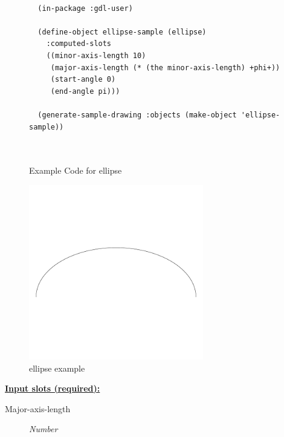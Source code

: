 \documentclass [11pt]{book}
\begin{document}
\begin{itemize}
\begin{figure}
\begin{lrbox}{\boxedverb}
\begin{minipage}{\linewidth}
{\begin{verbatim}
  
  (in-package :gdl-user)

  (define-object ellipse-sample (ellipse)
    :computed-slots
    ((minor-axis-length 10)
     (major-axis-length (* (the minor-axis-length) +phi+))
     (start-angle 0)
     (end-angle pi)))

  (generate-sample-drawing :objects (make-object 'ellipse-sample))
  
  
\end{verbatim}}
\end{minipage}
\end{lrbox}
\fbox{\usebox{\boxedverb}}

\caption{Example Code for ellipse}

\label{fig:example-code-ellipse}

\end{figure}

\begin{figure}
\begin{center}
\includegraphics[width=3in,height=3in]{../images/example-ellipse.pdf}
\end{center}

\caption{ellipse example}

\label{fig:ellipse}

\end{figure}





\textbf{
\underline{Input slots (required):}}

\begin{description}

\item [Major-axis-length]
\emph{Number}


\end{description}
\end{itemize}
\end{document}
